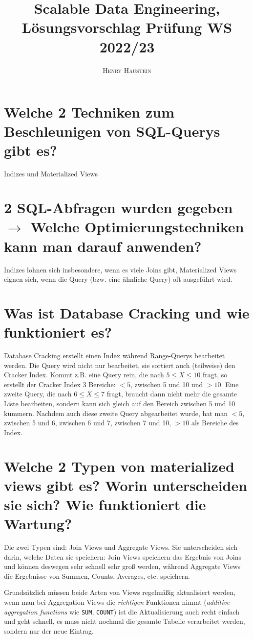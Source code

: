 \documentclass{article}
\title{\textbf{Scalable Data Engineering, Lösungsvorschlag Prüfung WS 2022/23}}
\author{\textsc{Henry Haustein}}
\date{}
\begin{document}
	\maketitle
	
	\section*{Welche 2 Techniken zum Beschleunigen von SQL-Querys gibt es?}
	Indizes und Materialized Views
	
	\section*{2 SQL-Abfragen wurden gegeben $\to$ Welche Optimierungstechniken kann man darauf anwenden?}
	Indizes lohnen sich insbesondere, wenn es viele Joins gibt, Materialized Views eignen sich, wenn die Query (bzw. eine ähnliche Query) oft ausgeführt wird.
	
	\section*{Was ist Database Cracking und wie funktioniert es?}
	Database Cracking erstellt einen Index während Range-Querys bearbeitet werden. Die Query wird nicht nur bearbeitet, sie sortiert auch (teilweise) den Cracker Index. Kommt z.B. eine Query rein, die nach $5 \le X \le 10$ fragt, so erstellt der Cracker Index 3 Bereiche: $<5$, zwischen 5 und 10 und $>10$. Eine zweite Query, die nach $6\le X\le 7$ fragt, braucht dann nicht mehr die gesamte Liste bearbeiten, sondern kann sich gleich auf den Bereich zwischen 5 und 10 kümmern. Nachdem auch diese zweite Query abgearbeitet wurde, hat man $<5$, zwischen 5 und 6, zwischen 6 und 7, zwischen 7 und 10, $>10$ als Bereiche des Index.
	
	\section*{Welche 2 Typen von materialized views gibt es? Worin unterscheiden sie sich? Wie funktioniert die Wartung?}
	Die zwei Typen sind: Join Views und Aggregate Views. Sie unterscheiden sich darin, welche Daten sie speichern: Join Views speichern das Ergebnis von Joins und können deswegen sehr schnell sehr groß werden, während Aggregate Views die Ergebnisse von Summen, Counts, Averages, etc. speichern.
	
	Grundsätzlich müssen beide Arten von Views regelmäßig aktualisiert werden, wenn man bei Aggregation Views die \textit{richtigen} Funktionen nimmt (\textit{additive aggregation functions} wie \texttt{SUM}, \texttt{COUNT}) ist die Aktualisierung auch recht einfach und geht schnell, es muss nicht nochmal die gesamte Tabelle verarbeitet werden, sondern nur der neue Eintrag.
	
\end{document}
